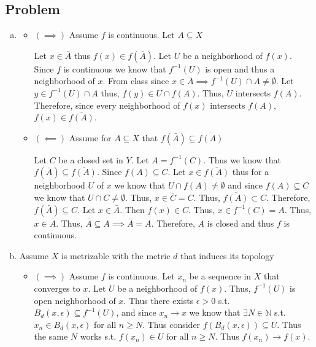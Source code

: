 \documentclass[12pt, letterpaper]{article}
\newcounter{problem}
\newcommand{\q}{
    \newpage %
    \stepcounter{problem} %
    \subsection*{Problem \arabic{problem}} %
}
\newcommand{\N}{\mathbb{N}}
\begin{document}
\setlength{\parindent}{0pt}
\pagestyle{fancy}
\fancyhf{}
\fancyhead[ROE]{\thepage}

\q
\begin{enumerate}[(a)]
    \item \begin{itemize}
        \item $(\implies)$ Assume $f$ is continuous. Let $A \subseteq X$
        
        Let $x \in \bar{A}$ thus $f(x) \in f(\bar{A})$. Let $U$ be a neighborhood of $f(x)$. Since $f$ is continuous we know that $f^{-1}(U)$ is open and thus a neighborhood of $x$. From class since $x \in \bar{A} \implies f^{-1}(U) \cap A \neq \emptyset$.
        Let $y \in f^{-1}(U) \cap A$ thus, $f(y) \in U \cap f(A)$. Thus, $U$ intersects $f(A)$. Therefore, since every neighborhood of $f(x)$ intersects $f(A)$, $f(x) \in \overline{f(A)}$.

        \item $(\impliedby)$ Assume for $A \subseteq X$ that $f(\bar{A}) \subseteq \overline{f(A)}$
        
        Let $C$ be a closed set in $Y$. Let $A=f^{-1}(C)$. Thus we know that $f(\bar{A}) \subseteq \overline{f(A)}$. Since $f(A) \subseteq C$. Let $x \in \overline{f(A)}$ thus for a neighborhood $U$ of $x$ we know that $U \cap f(A) \neq \emptyset$ and since $f(A) \subseteq C$ we know that $U \cap C \neq \emptyset$. Thus, $x \in \bar{C}=C$. Thus, $\overline{f(A)} \subset C$.
        Therefore, $f(\bar{A}) \subseteq C$. Let $x \in \bar{A}$. Then $f(x) \in C$. Thus, $x \in f^{-1}(C)=A$. Thus, $x \in \bar{A}$. Thus, $\bar{A} \subseteq A \implies \bar{A}=A$. Therefore, $A$ is closed and thus $f$ is continuous.
    \end{itemize}

    \item Assume $X$ is metrizable with the metric $d$ that induces its topology
    \begin{itemize}
        \item $(\implies)$ Assume $f$ is continuous. Let $x_n$ be a sequence in $X$ that converges to $x$. Let $U$ be a neighborhood of $f(x)$. Thus, $f^{-1}(U)$ is open neighborhood of $x$. Thus there exists $\epsilon >0$ s.t. $B_d(x,\epsilon) \subseteq f^{-1}(U)$, and
        since $x_n \to x$ we know that $\exists N \in \N$ s.t. $x_n \in B_d(x,\epsilon)$ for all $n \geq N$. Thus consider $f(B_d(x,\epsilon)) \subseteq U$. Thus the same $N$ works s.t. $f(x_n) \in U$ for all $n \geq N$. Thus $f(x_n) \to f(x)$.


\end{itemize}
\end{enumerate}
\end{document}
